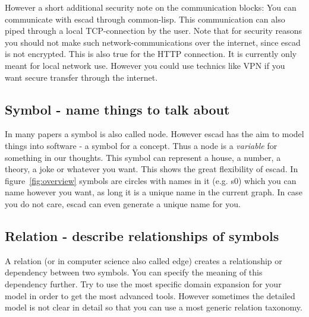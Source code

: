 \documentclass[a4paper, 12pt, openany]{scrbook}
\begin{document}
However a short additional security note on the communication blocks: You can communicate with escad through common-lisp. This communication can also piped through a local TCP-connection by the user. Note that for security reasons you should not make such network-communications over the internet, since escad is not encrypted. This is also true for the HTTP connection. It is currently only meant for local network use. However you could use technics like VPN if you want secure transfer through the internet.
\subsection{Symbol - name things to talk about}
In many papers a symbol is also called node. However escad has the aim to model things into software - a symbol for a concept. Thus a node is a \emph{variable} for something in our thoughts. This symbol can represent a house, a number, a theory, a joke or whatever you want. This shows the great flexibility of escad. In figure~\ref{fig:overview} symbols are circles with names in it (e.g. s0) which you can name however you want, as long it is a unique name in the current graph. In case you do not care, escad can even generate a unique name for you.
\subsection{Relation - describe relationships of symbols}
A relation (or in computer science also called edge) creates a relationship or dependency between two symbols. You can specify the meaning of this dependency further. Try to use the most specific domain expansion for your model in order to get the most advanced tools. However sometimes the detailed model is not clear in detail so that you can use a most generic relation taxonomy.
\end{document}
